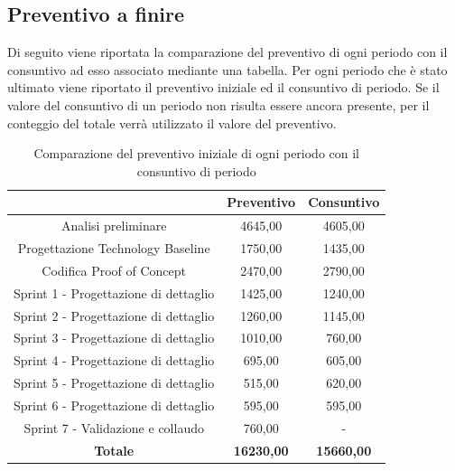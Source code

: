 
\subsection{Preventivo a finire} \label{subsection:preventivo_a_finire}
Di seguito viene riportata la comparazione del preventivo di ogni periodo con il consuntivo ad esso associato mediante una tabella.
Per ogni periodo che è stato ultimato viene riportato il preventivo iniziale ed il consuntivo di periodo.
Se il valore del consuntivo di un periodo non risulta essere ancora presente, per il conteggio del totale verrà utilizzato il valore del preventivo.
\begin{table}[H]
  \centering
  \renewcommand{\arraystretch}{1.8}
  \begin{tabular}{c|c|c}
    \rowcolor[HTML]{125E28}
    \multicolumn{1}{c}{\color[HTML]{FFFFFF}\textbf{Periodo}}
                                          & \multicolumn{1}{c}{\color[HTML]{FFFFFF}\textbf{Preventivo}}
                                          & \multicolumn{1}{c}{\color[HTML]{FFFFFF}\textbf{Consuntivo}}                     \\
    \hline
    Analisi preliminare                   & 4645,00                                                     & 4605,00           \\
    Progettazione Technology Baseline     & 1750,00                                                     & 1435,00           \\
    Codifica Proof of Concept             & 2470,00                                                     & 2790,00           \\
    Sprint 1 - Progettazione di dettaglio & 1425,00                                                     & 1240,00           \\
    Sprint 2 - Progettazione di dettaglio & 1260,00                                                     & 1145,00           \\
    Sprint 3 - Progettazione di dettaglio & 1010,00                                                     & 760,00            \\
    Sprint 4 - Progettazione di dettaglio & 695,00                                                      & 605,00            \\
    Sprint 5 - Progettazione di dettaglio & 515,00                                                      & 620,00            \\
    Sprint 6 - Progettazione di dettaglio & 595,00                                                      & 595,00            \\
    Sprint 7 - Validazione e collaudo     & 760,00                                                      & -                 \\
    \textbf{Totale}                       & \textbf{16230,00}                                           & \textbf{15660,00} \\
  \end{tabular}
  \caption{Comparazione del preventivo iniziale di ogni periodo con il consuntivo di periodo}
\end{table}
